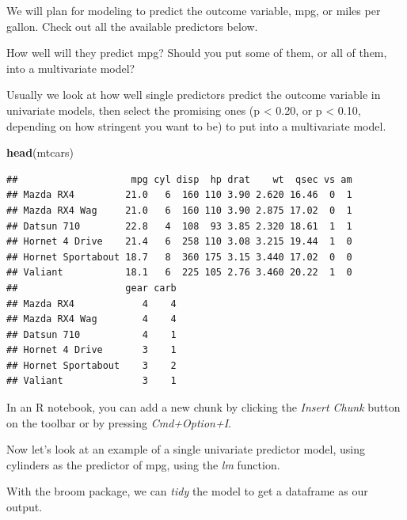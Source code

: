 \documentclass[
]{book}
\newenvironment{Shaded}{\begin{snugshade}}{\end{snugshade}}
\newcommand{\DataTypeTok}[1]{\textcolor[rgb]{0.13,0.29,0.53}{#1}}
\newcommand{\KeywordTok}[1]{\textcolor[rgb]{0.13,0.29,0.53}{\textbf{#1}}}
\newcommand{\NormalTok}[1]{#1}
\newcommand{\OperatorTok}[1]{\textcolor[rgb]{0.81,0.36,0.00}{\textbf{#1}}}
\newcommand{\StringTok}[1]{\textcolor[rgb]{0.31,0.60,0.02}{#1}}
\begin{document}
We will plan for modeling to predict the outcome variable, mpg, or miles per gallon.
Check out all the available predictors below.

How well will they predict mpg?
Should you put some of them, or all of them, into a multivariate model?

Usually we look at how well single predictors predict the outcome variable in univariate models, then select the promising ones (p \textless{} 0.20, or p \textless{} 0.10, depending on how stringent you want to be) to put into a multivariate model.

\begin{Shaded}
\begin{Highlighting}[]
\KeywordTok{head}\NormalTok{(mtcars)}
\end{Highlighting}
\end{Shaded}

\begin{verbatim}
##                    mpg cyl disp  hp drat    wt  qsec vs am
## Mazda RX4         21.0   6  160 110 3.90 2.620 16.46  0  1
## Mazda RX4 Wag     21.0   6  160 110 3.90 2.875 17.02  0  1
## Datsun 710        22.8   4  108  93 3.85 2.320 18.61  1  1
## Hornet 4 Drive    21.4   6  258 110 3.08 3.215 19.44  1  0
## Hornet Sportabout 18.7   8  360 175 3.15 3.440 17.02  0  0
## Valiant           18.1   6  225 105 2.76 3.460 20.22  1  0
##                   gear carb
## Mazda RX4            4    4
## Mazda RX4 Wag        4    4
## Datsun 710           4    1
## Hornet 4 Drive       3    1
## Hornet Sportabout    3    2
## Valiant              3    1
\end{verbatim}

In an R notebook, you can add a new chunk by clicking the \emph{Insert Chunk} button on the toolbar or by pressing \emph{Cmd+Option+I}.

Now let's look at an example of a single univariate predictor model, using cylinders as the predictor of mpg, using the \emph{lm} function.

With the broom package, we can \emph{tidy} the model to get a dataframe as our output.

\begin{Shaded}
\end{Shaded}
\end{document}
